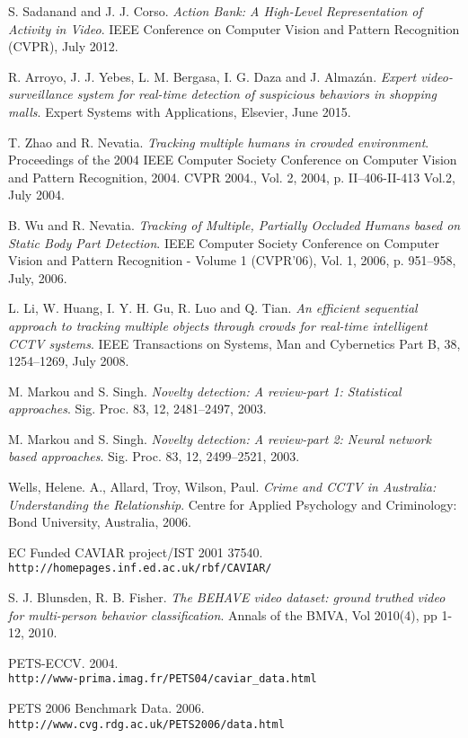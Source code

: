 \begin{thebibliography}{20}
S. Sadanand and J. J. Corso.
\textit{Action Bank: A High-Level Representation of Activity in Video}. 
IEEE Conference on Computer Vision and Pattern Recognition (CVPR), July 2012. 

R. Arroyo, J. J. Yebes, L. M. Bergasa, I. G. Daza and J. Almazán.
\textit{Expert video-surveillance system for real-time detection of suspicious behaviors in shopping malls}. 
Expert Systems with Applications, Elsevier, June 2015.

T. Zhao and R. Nevatia.
\textit{Tracking multiple humans in crowded environment}. 
Proceedings of the 2004 IEEE Computer Society Conference on Computer Vision and Pattern Recognition, 2004. CVPR 2004., Vol. 2, 2004, p. II–406-II-413 Vol.2, July 2004.

B. Wu and R. Nevatia.
\textit{Tracking of Multiple, Partially Occluded Humans based on Static Body Part Detection}. 
IEEE Computer Society Conference on Computer Vision and Pattern Recognition - Volume 1 (CVPR'06), Vol. 1, 2006, p. 951–958, July, 2006.

L. Li, W. Huang, I. Y. H. Gu, R. Luo and Q. Tian.
\textit{An efficient sequential approach to tracking multiple objects through crowds for real-time intelligent CCTV systems}. 
IEEE Transactions on Systems, Man and Cybernetics Part B, 38, 1254–1269, July 2008.

M. Markou and S. Singh.
\textit{Novelty detection: A review-part 1: Statistical approaches}. 
Sig. Proc. 83, 12, 2481–2497, 2003.

M. Markou and S. Singh.
\textit{Novelty detection: A review-part 2: Neural network based approaches}. 
Sig. Proc. 83, 12, 2499–2521, 2003.

Wells, Helene. A., Allard, Troy, Wilson, Paul.
\textit{Crime and CCTV in Australia: Understanding the Relationship}. 
Centre for Applied Psychology and Criminology: Bond University, Australia, 2006.

EC Funded CAVIAR project/IST 2001 37540.
\\\texttt{http://homepages.inf.ed.ac.uk/rbf/CAVIAR/}

S. J. Blunsden, R. B. Fisher.
\textit{The BEHAVE video dataset: ground truthed video for multi-person behavior classification}. 
Annals of the BMVA, Vol 2010(4), pp 1-12, 2010.

PETS-ECCV. 2004.
\\\texttt{http://www-prima.imag.fr/PETS04/caviar\_data.html}

PETS 2006 Benchmark Data. 2006.
\\\texttt{http://www.cvg.rdg.ac.uk/PETS2006/data.html}
 


\end{thebibliography}
